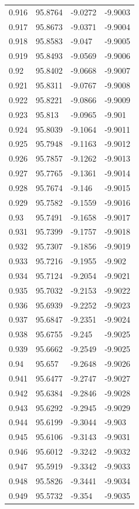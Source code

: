 \begin{tabular}{llll}
0.916 & 95.8764 & -9.0272 & -9.9003 \\
0.917 & 95.8673 & -9.0371 & -9.9004 \\
0.918 & 95.8583 & -9.047 & -9.9005 \\
0.919 & 95.8493 & -9.0569 & -9.9006 \\
0.92 & 95.8402 & -9.0668 & -9.9007 \\
0.921 & 95.8311 & -9.0767 & -9.9008 \\
0.922 & 95.8221 & -9.0866 & -9.9009 \\
0.923 & 95.813 & -9.0965 & -9.901 \\
0.924 & 95.8039 & -9.1064 & -9.9011 \\
0.925 & 95.7948 & -9.1163 & -9.9012 \\
0.926 & 95.7857 & -9.1262 & -9.9013 \\
0.927 & 95.7765 & -9.1361 & -9.9014 \\
0.928 & 95.7674 & -9.146 & -9.9015 \\
0.929 & 95.7582 & -9.1559 & -9.9016 \\
0.93 & 95.7491 & -9.1658 & -9.9017 \\
0.931 & 95.7399 & -9.1757 & -9.9018 \\
0.932 & 95.7307 & -9.1856 & -9.9019 \\
0.933 & 95.7216 & -9.1955 & -9.902 \\
0.934 & 95.7124 & -9.2054 & -9.9021 \\
0.935 & 95.7032 & -9.2153 & -9.9022 \\
0.936 & 95.6939 & -9.2252 & -9.9023 \\
0.937 & 95.6847 & -9.2351 & -9.9024 \\
0.938 & 95.6755 & -9.245 & -9.9025 \\
0.939 & 95.6662 & -9.2549 & -9.9025 \\
0.94 & 95.657 & -9.2648 & -9.9026 \\
0.941 & 95.6477 & -9.2747 & -9.9027 \\
0.942 & 95.6384 & -9.2846 & -9.9028 \\
0.943 & 95.6292 & -9.2945 & -9.9029 \\
0.944 & 95.6199 & -9.3044 & -9.903 \\
0.945 & 95.6106 & -9.3143 & -9.9031 \\
0.946 & 95.6012 & -9.3242 & -9.9032 \\
0.947 & 95.5919 & -9.3342 & -9.9033 \\
0.948 & 95.5826 & -9.3441 & -9.9034 \\
0.949 & 95.5732 & -9.354 & -9.9035 \\

\end{tabular}

